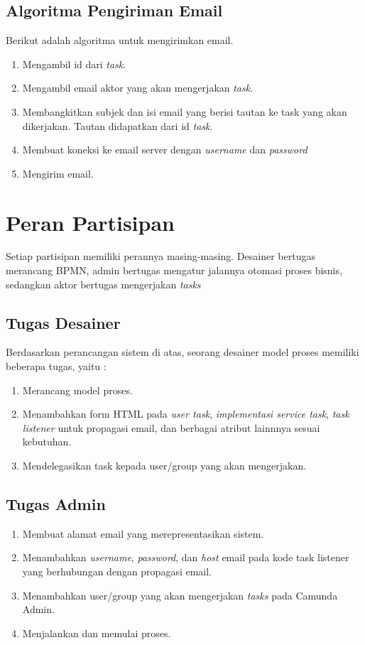 \subsection{Algoritma Pengiriman Email}
\label{sec:algoritma}

Berikut adalah algoritma untuk mengirimkan email.
\begin{enumerate}
	\item Mengambil id dari \textit{task}.
	\item Mengambil email aktor yang akan mengerjakan \textit{task}.
	\item Membangkitkan subjek dan isi email yang berisi tautan ke task yang akan dikerjakan. Tautan didapatkan dari id \textit{task}.
	\item Membuat koneksi ke email server dengan \textit{username} dan \textit{password}
	\item Mengirim email.
\end{enumerate}


\section{Peran Partisipan}
\label{peranpartisipan}
Setiap partisipan memiliki perannya masing-masing. Desainer bertugas merancang BPMN, admin bertugas mengatur jalannya otomasi proses bisnis, sedangkan aktor bertugas mengerjakan \textit{tasks}
\subsection{Tugas Desainer}
\label{tugasdesainer}
Berdasarkan perancangan sistem di atas, seorang desainer model proses memiliki beberapa tugas, yaitu :
\begin{enumerate}
	\item Merancang model proses.
	\item Menambahkan form HTML pada \textit{user task}, \textit{implementasi service task}, \textit{task listener} untuk propagasi email, dan berbagai atribut lainnnya sesuai kebutuhan.
	\item Mendelegasikan task kepada user/group yang akan mengerjakan.
\end{enumerate}

\subsection{Tugas Admin}	
\label{tugasadmin}
\begin{enumerate}
	\item Membuat alamat email yang merepresentasikan sistem.
	\item Menambahkan \textit{username}, \textit{password}, dan \textit{host} email pada kode task listener yang berhubungan dengan propagasi email.
	\item Menambahkan user/group yang akan mengerjakan \textit{tasks} pada Camunda Admin.
	\item Menjalankan dan memulai proses.
\end{enumerate}

